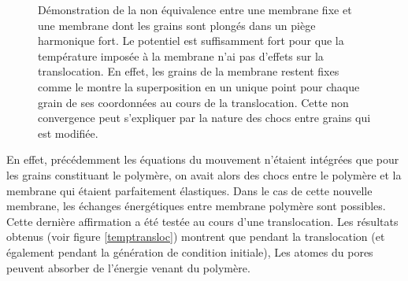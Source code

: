 \begin{figure}[H]
\begin{minipage}{0.63\linewidth}
\end{minipage}
\begin{minipage}{0.37\linewidth} 
\caption[Non convergence des modèles]{Démonstration de la non équivalence entre une membrane fixe et une membrane dont les grains sont plongés dans un piège harmonique fort. Le potentiel est suffisamment fort pour que la température imposée à la membrane n'ai pas d'effets sur la translocation. En effet, les grains de la membrane restent fixes comme le montre la superposition en un unique point pour chaque grain de ses coordonnées au cours de la translocation. Cette non convergence peut s'expliquer par la nature des chocs entre grains qui est modifiée.}
\label{convinfforte}
\end{minipage}
\end{figure}


En effet, précédemment les équations du mouvement n'étaient intégrées que pour les grains constituant le polymère, on avait alors des chocs entre le polymère et la membrane qui étaient parfaitement élastiques. Dans le cas de cette nouvelle membrane, les échanges énergétiques entre membrane polymère sont possibles. Cette dernière affirmation a été testée au cours d'une translocation. Les résultats obtenus (voir figure \ref{temptransloc}) montrent que pendant la translocation (et également pendant la génération de condition initiale), Les atomes du pores peuvent absorber de l'énergie venant du polymère.


